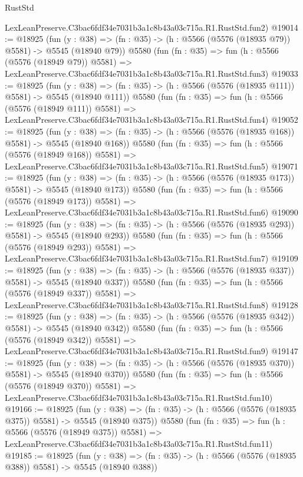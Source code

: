 \begin{lexlean}{RustStd}
\begin{coremodule}
    LexLeanPreserve.C3bac6fdf34e7031b3a1c8b43a03c715a.R1.RustStd.fun2)
@19014 := @18925
    (fun (y : @38) => (fn : @35) -> (h : @5566 (@5576 (@18935 @79)) @5581) -> @5545 (@18940 @79))
    @5580
    (fun (fn : @35) =>
    fun (h : @5566 (@5576 (@18949 @79)) @5581) =>
    LexLeanPreserve.C3bac6fdf34e7031b3a1c8b43a03c715a.R1.RustStd.fun3)
@19033 := @18925
    (fun (y : @38) => (fn : @35) -> (h : @5566 (@5576 (@18935 @111)) @5581) -> @5545 (@18940 @111))
    @5580
    (fun (fn : @35) =>
    fun (h : @5566 (@5576 (@18949 @111)) @5581) =>
    LexLeanPreserve.C3bac6fdf34e7031b3a1c8b43a03c715a.R1.RustStd.fun4)
@19052 := @18925
    (fun (y : @38) => (fn : @35) -> (h : @5566 (@5576 (@18935 @168)) @5581) -> @5545 (@18940 @168))
    @5580
    (fun (fn : @35) =>
    fun (h : @5566 (@5576 (@18949 @168)) @5581) =>
    LexLeanPreserve.C3bac6fdf34e7031b3a1c8b43a03c715a.R1.RustStd.fun5)
@19071 := @18925
    (fun (y : @38) => (fn : @35) -> (h : @5566 (@5576 (@18935 @173)) @5581) -> @5545 (@18940 @173))
    @5580
    (fun (fn : @35) =>
    fun (h : @5566 (@5576 (@18949 @173)) @5581) =>
    LexLeanPreserve.C3bac6fdf34e7031b3a1c8b43a03c715a.R1.RustStd.fun6)
@19090 := @18925
    (fun (y : @38) => (fn : @35) -> (h : @5566 (@5576 (@18935 @293)) @5581) -> @5545 (@18940 @293))
    @5580
    (fun (fn : @35) =>
    fun (h : @5566 (@5576 (@18949 @293)) @5581) =>
    LexLeanPreserve.C3bac6fdf34e7031b3a1c8b43a03c715a.R1.RustStd.fun7)
@19109 := @18925
    (fun (y : @38) => (fn : @35) -> (h : @5566 (@5576 (@18935 @337)) @5581) -> @5545 (@18940 @337))
    @5580
    (fun (fn : @35) =>
    fun (h : @5566 (@5576 (@18949 @337)) @5581) =>
    LexLeanPreserve.C3bac6fdf34e7031b3a1c8b43a03c715a.R1.RustStd.fun8)
@19128 := @18925
    (fun (y : @38) => (fn : @35) -> (h : @5566 (@5576 (@18935 @342)) @5581) -> @5545 (@18940 @342))
    @5580
    (fun (fn : @35) =>
    fun (h : @5566 (@5576 (@18949 @342)) @5581) =>
    LexLeanPreserve.C3bac6fdf34e7031b3a1c8b43a03c715a.R1.RustStd.fun9)
@19147 := @18925
    (fun (y : @38) => (fn : @35) -> (h : @5566 (@5576 (@18935 @370)) @5581) -> @5545 (@18940 @370))
    @5580
    (fun (fn : @35) =>
    fun (h : @5566 (@5576 (@18949 @370)) @5581) =>
    LexLeanPreserve.C3bac6fdf34e7031b3a1c8b43a03c715a.R1.RustStd.fun10)
@19166 := @18925
    (fun (y : @38) => (fn : @35) -> (h : @5566 (@5576 (@18935 @375)) @5581) -> @5545 (@18940 @375))
    @5580
    (fun (fn : @35) =>
    fun (h : @5566 (@5576 (@18949 @375)) @5581) =>
    LexLeanPreserve.C3bac6fdf34e7031b3a1c8b43a03c715a.R1.RustStd.fun11)
@19185 := @18925
    (fun (y : @38) => (fn : @35) -> (h : @5566 (@5576 (@18935 @388)) @5581) -> @5545 (@18940 @388))

\end{coremodule}
\end{lexlean}
